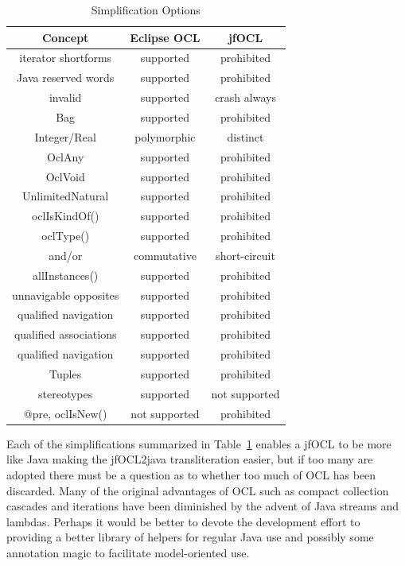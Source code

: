 \documentclass[sigconf]{acmart}
\begin{document}
\begin{table}
\begin{tabular}{ c | c | c }
Concept & Eclipse OCL & jfOCL \\
\hline
iterator shortforms & supported & prohibited \\
Java reserved words & supported & prohibited \\
\hline
invalid & supported & crash always \\
Bag & supported & prohibited \\
Integer/Real & polymorphic & distinct \\
OclAny & supported & prohibited \\
OclVoid & supported & prohibited \\
UnlimitedNatural & supported & prohibited \\
oclIsKindOf() & supported & prohibited \\
oclType() & supported & prohibited \\
and/or & commutative & short-circuit \\
\hline
allInstances() & supported & prohibited \\
unnavigable opposites & supported & prohibited \\
qualified navigation & supported & prohibited \\
qualified associations & supported & prohibited \\
qualified navigation & supported & prohibited \\
Tuples & supported & prohibited \\
\hline
stereotypes & supported & not supported \\
@pre, oclIsNew() & not supported & prohibited \\
\end{tabular}
\caption{Simplification Options}
\label{tab:Simplifications}
\end{table}

Each of the simplifications summarized in Table~\ref{tab:Simplifications} enables a jfOCL to be more like Java making the jfOCL2java transliteration easier, but if too many are adopted there must be a question as to whether too much of OCL has been discarded. Many of the original advantages of OCL such as compact collection cascades and iterations have been diminished by the advent of Java streams and lambdas. Perhaps it would be better to devote the development effort to providing a better library of helpers for regular Java use and possibly some annotation magic to facilitate model-oriented use.
\end{document}
